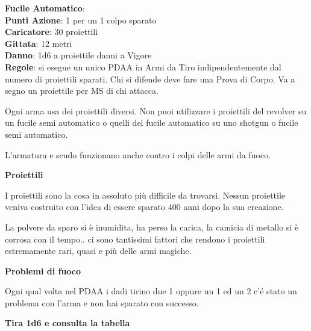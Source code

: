 \documentclass[12pt,a4paper,twoside,openany]{book}
\begin{document}
\begin{multicols}{2}
\textbf{Fucile Automatico}:\\
\textbf{Punti Azione}: 1 per un 1 colpo sparato\\
\textbf{Caricatore}: 30 proiettili\\
\textbf{Gittata}: 12 metri\\
\textbf{Danno}: 1d6 a proiettile danni a Vigore\\
\textbf{Regole}: si esegue un unico PDAA in Armi da Tiro indipendentemente dal numero di proiettili sparati. Chi si difende deve fare una Prova di Corpo. Va a segno un proiettile per MS di chi attacca.

\bigskip

Ogni arma usa dei proiettili diversi. Non puoi utilizzare i proiettili del revolver su un fucile semi automatico o quelli del fucile automatico su uno shotgun o fucile semi automatico.

L'armatura e scudo funzionano anche contro i colpi delle armi da fuoco.

\begin{center}
	\textbf{Proiettili}
\end{center}

I proiettili sono la cosa in assoluto più difficile da trovarsi. Nessun proiettile veniva costruito con l'idea di essere sparato 400 anni dopo la sua creazione.

La polvere da sparo si è inumidita, ha perso la carica, la camicia di metallo si è corrosa con il tempo.. ci sono tantissimi fattori che rendono i proiettili estremamente rari, quasi e più delle armi magiche.

\begin{center}
	\textbf{Problemi di fuoco}
\end{center}

Ogni qual volta nel PDAA i dadi tirino due 1 oppure un 1 ed un 2 c'é stato un problema con l'arma e non hai sparato con successo.

\end{multicols}

\textbf{Tira 1d6 e consulta la tabella}

\medskip
\end{document}
